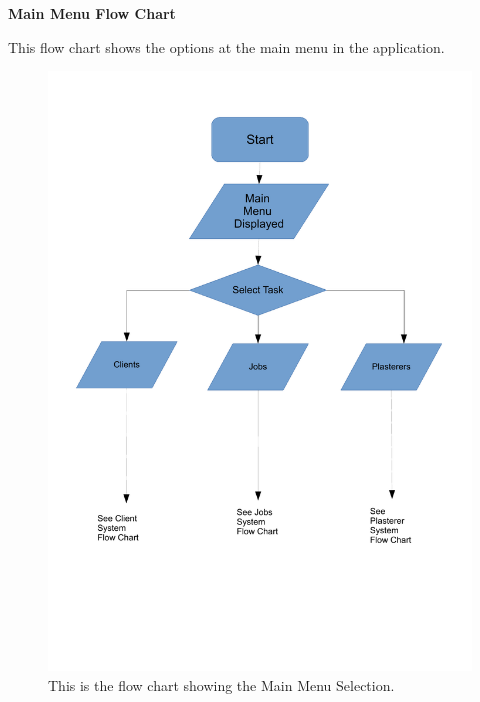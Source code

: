 \pagebreak
\textbf{Main Menu Flow Chart}
\begin{flushleft}
This flow chart shows the options at the main menu in the application.
\end{flushleft}
\begin{figure}[H]
    \includegraphics[scale=0.4]{./Design/images/FlowChartMainMenu.pdf}
    \caption{This is the flow chart showing the Main Menu Selection.} \label{fig:FlowChartMainMenu}
\end{figure}


